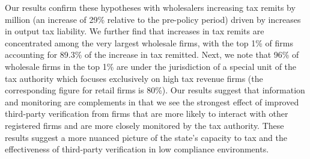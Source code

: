 Our results confirm these hypotheses with wholesalers increasing tax remits by  million (an increase of 29\% relative to the pre-policy period) driven by increases in output tax liability. We further find that increases in tax remits are concentrated among the very largest wholesale firms, with the top 1\% of firms accounting for 89.3\% of the increase in tax remitted.  Next, we note that 96\% of wholesale firms in the top 1\% are under the jurisdiction of a special unit of the tax authority which focuses exclusively on high tax revenue firms (the corresponding figure for retail firms is 80\%). Our results suggest that information and monitoring are complements in that we see the strongest effect of improved third-party verification from firms that are more likely to interact with other registered firms and are more closely monitored by the tax authority. These results suggest a more nuanced picture of the state's capacity to tax and the effectiveness of third-party verification in low compliance environments.